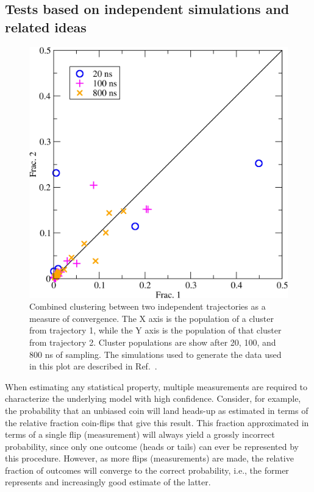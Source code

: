 \subsection{Tests based on independent simulations and related ideas}

\begin{figure}
  \centering
  \includegraphics[width=0.9\linewidth]{figures/combinedcluster}
  \caption{Combined clustering between two independent trajectories as a measure of convergence. The X axis is the population of a cluster from trajectory 1, while the Y axis is the population of that cluster from trajectory 2. Cluster populations are show after 20, 100, and 800 ns of sampling. The simulations used to generate the data used in this plot are described in Ref.\ \citep{Roe2014}.}
  \label{f:combinedcluster} 
\end{figure}

When estimating any statistical property, multiple measurements are required to characterize the underlying model with high confidence. Consider, for example, the probability that an unbiased coin will land heads-up as estimated in terms of the relative fraction coin-flips that give this result.  This fraction approximated in terms of a single flip (measurement) will always yield a grossly incorrect probability, since only one outcome (heads or tails) can ever be represented by this procedure.  However, as more flips (measurements) are made, the relative fraction of outcomes will converge to the correct probability, i.e., the former represents and increasingly good estimate of the latter.  

